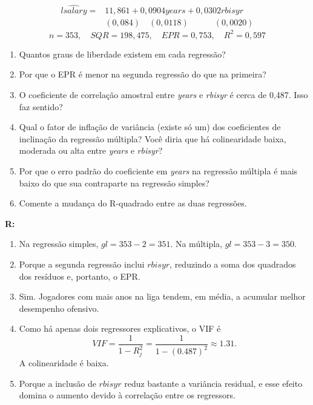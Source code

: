 \documentclass[12pt,letterpaper, onecolumn]{exam}
\renewenvironment{solution}
  {\par\noindent\textbf{R:}\enspace\color{blue}}
  {\par\color{black}}
\begin{document}
\begin{questions}
\begin{equation*}\begin{split}
        \widehat{lsalary} = & 11,861 + 0,0904 years + 0,0302rbisyr\\
        \quad & (0,084) \quad(0,0118) \quad\quad \quad (0,0020) \end{split}
\end{equation*}\begin{equation*}
    n = 353, \quad SQR = 198,475, \quad EPR = 0,753, \quad R^2 = 0,597
\end{equation*}
\begin{enumerate}[label=(\alph*)]
    \item Quantos graus de liberdade existem em cada regressão?
    \item Por que o EPR é menor na segunda regressão do que na primeira?
    \item O coeficiente de correlação amostral entre \textit{years} e \textit{rbisyr} é cerca de 0,487. Isso faz sentido?
    \item Qual o fator de inflação de variância (existe só um) dos coeficientes de inclinação da regressão múltipla? Você diria que há colinearidade baixa, moderada ou alta entre \textit{years} e \textit{rbisyr}?
    \item Por que o erro padrão do coeficiente em \textit{years} na regressão múltipla é mais baixo do que sua contraparte na regressão simples?
    \item Comente a mudança do R-quadrado entre as duas regressões.
\end{enumerate}
\begin{solution}
\begin{enumerate}[label=(\alph*)]
    \item Na regressão simples, \(gl = 353-2=351\). Na múltipla, \(gl = 353-3=350\).
    
    \item Porque a segunda regressão inclui \(rbisyr\), reduzindo a soma dos quadrados dos resíduos e, portanto, o EPR.
    
    \item Sim. Jogadores com mais anos na liga tendem, em média, a acumular melhor desempenho ofensivo.
    
    \item Como há apenas dois regressores explicativos, o VIF é
    \[
    VIF=\frac{1}{1-R_j^2}=\frac{1}{1-(0.487)^2}\approx 1.31.
    \]
    A colinearidade é baixa.
    
    \item Porque a inclusão de \(rbisyr\) reduz bastante a variância residual, e esse efeito domina o aumento devido à correlação entre os regressors.
    

\end{enumerate}
\end{solution}
\end{questions}
\end{document}
